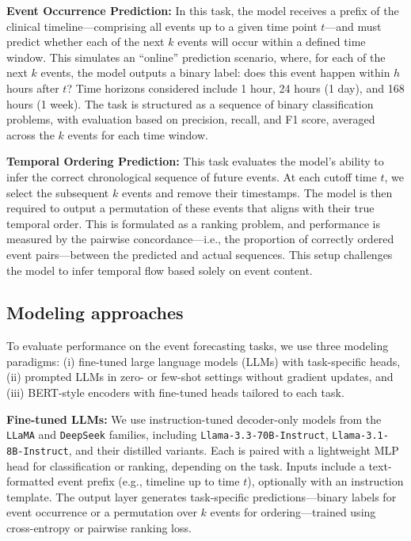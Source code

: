 \textbf{Event Occurrence Prediction:} In this task, the model receives a prefix of the clinical timeline—comprising all events up to a given time point $t$—and must predict whether each of the next $k$ events will occur within a defined time window. This simulates an “online” prediction scenario, where, for each of the next $k$ events, the model outputs a binary label: does this event happen within $h$ hours after $t$? Time horizons considered include 1 hour, 24 hours (1 day), and 168 hours (1 week). The task is structured as a sequence of binary classification problems, with evaluation based on precision, recall, and F1 score, averaged across the $k$ events for each time window.

\textbf{Temporal Ordering Prediction:} This task evaluates the model’s ability to infer the correct chronological sequence of future events. At each cutoff time $t$, we select the subsequent $k$ events and remove their timestamps. The model is then required to output a permutation of these events that aligns with their true temporal order. This is formulated as a ranking problem, and performance is measured by the pairwise concordance—i.e., the proportion of correctly ordered event pairs—between the predicted and actual sequences. This setup challenges the model to infer temporal flow based solely on event content.

\subsection{Modeling approaches}

To evaluate performance on the event forecasting tasks, we use three modeling paradigms: (i) fine-tuned large language models (LLMs) with task-specific heads, (ii) prompted LLMs in zero- or few-shot settings without gradient updates, and (iii) BERT-style encoders with fine-tuned heads tailored to each task.

\textbf{Fine-tuned LLMs:} We use instruction-tuned decoder-only models from the \texttt{LLaMA} and \texttt{DeepSeek} families, including \texttt{Llama-3.3-70B-Instruct}, \texttt{Llama-3.1-8B-Instruct}, and their distilled variants. Each is paired with a lightweight MLP head for classification or ranking, depending on the task. Inputs include a text-formatted event prefix (e.g., timeline up to time $t$), optionally with an instruction template. The output layer generates task-specific predictions—binary labels for event occurrence or a permutation over $k$ events for ordering—trained using cross-entropy or pairwise ranking loss.

